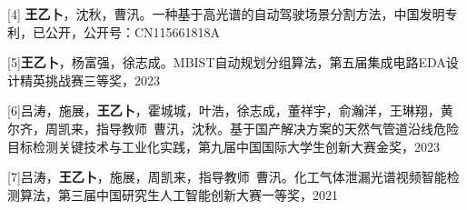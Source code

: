 \documentclass[
    type = master, %
    degree = academic,        %
    decl-page,  %
  ]{njuthesis}
\begin{document}
[4]	\textbf{王乙卜}，沈秋，曹汛。一种基于高光谱的自动驾驶场景分割方法，中国发明专利，已公开，公开号：CN115661818A


[5]\textbf{王乙卜}，杨富强，徐志成。MBIST自动规划分组算法，第五届集成电路EDA设计精英挑战赛三等奖，2023

[6]吕涛，施展，\textbf{王乙卜}，霍城城，叶浩，徐志成，董祥宇，俞瀚洋，王琳翔，黄尔齐，周凯来，指导教师\ 曹汛，沈秋。基于国产解决方案的天然气管道沿线危险目标检测关键技术与工业化实践，第九届中国国际大学生创新大赛金奖，2023

[7]吕涛，\textbf{王乙卜}，施展，周凯来，指导教师\ 曹汛。化工气体泄漏光谱视频智能检测算法，第三届中国研究生人工智能创新大赛一等奖，2021





\end{document}
